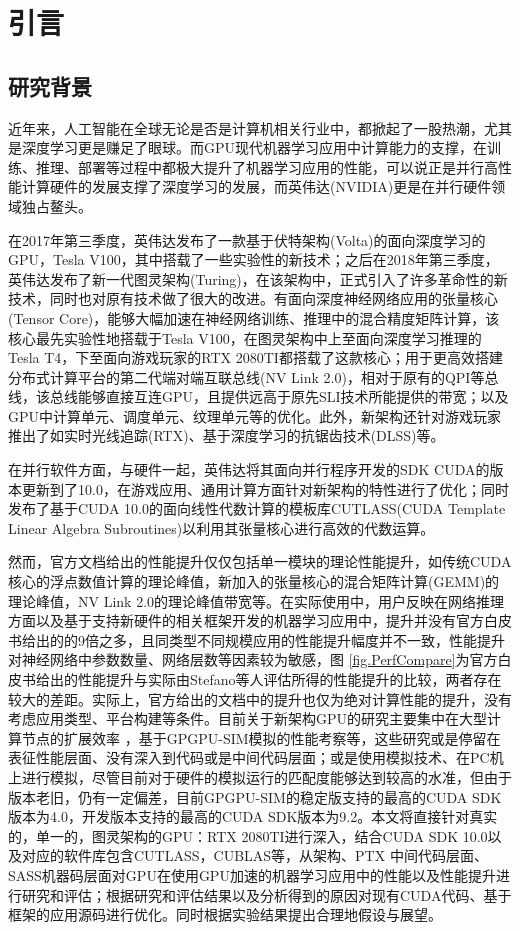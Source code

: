 \newpage
\section{引言}
\setcounter{table}{0}
\setcounter{figure}{0}
\subsection{研究背景}
\par 近年来，人工智能在全球无论是否是计算机相关行业中，都掀起了一股热潮，尤其是深度学习更是赚足了眼球。而GPU现代机器学习应用中计算能力的支撑，在训练、推理、部署等过程中都极大提升了机器学习应用的性能，可以说正是并行高性能计算硬件的发展支撑了深度学习的发展，而英伟达(NVIDIA)更是在并行硬件领域独占鳌头。
\par 在2017年第三季度，英伟达发布了一款基于伏特架构(Volta)的面向深度学习的GPU，Tesla V100\cite{TESLAV100}，其中搭载了一些实验性的新技术；之后在2018年第三季度，英伟达发布了新一代图灵架构(Turing)，在该架构中，正式引入了许多革命性的新技术，同时也对原有技术做了很大的改进。有面向深度神经网络应用的张量核心(Tensor Core)\cite{TENSORCORE}，能够大幅加速在神经网络训练、推理中的混合精度矩阵计算，该核心最先实验性地搭载于Tesla V100，在图灵架构中上至面向深度学习推理的Tesla T4，下至面向游戏玩家的RTX 2080TI都搭载了这款核心；用于更高效搭建分布式计算平台的第二代端对端互联总线(NV Link 2.0)\cite{NVLINK2}，相对于原有的QPI等总线，该总线能够直接互连GPU，且提供远高于原先SLI技术所能提供的带宽；以及GPU中计算单元、调度单元、纹理单元等的优化。此外，新架构还针对游戏玩家推出了如实时光线追踪(RTX)、基于深度学习的抗锯齿技术(DLSS)等。
\par 在并行软件方面，与硬件一起，英伟达将其面向并行程序开发的SDK CUDA的版本更新到了10.0，在游戏应用、通用计算方面针对新架构的特性进行了优化；同时发布了基于CUDA 10.0的面向线性代数计算的模板库CUTLASS(CUDA Template Linear Algebra Subroutines)\cite{CUTLASS}以利用其张量核心进行高效的代数运算。
\par 然而，官方文档给出的性能提升仅仅包括单一模块的理论性能提升，如传统CUDA核心的浮点数值计算的理论峰值，新加入的张量核心的混合矩阵计算(GEMM)的理论峰值，NV Link 2.0的理论峰值带宽等。在实际使用中，用户反映在网络推理方面以及基于支持新硬件的相关框架开发的机器学习应用中，提升并没有官方白皮书给出的的9倍之多\cite{VOLTAWHITEPAPER}，且同类型不同规模应用的性能提升幅度并不一致，性能提升对神经网络中参数数量、网络层数等因素较为敏感，图 \ref{fig.PerfCompare}为官方白皮书给出的性能提升与实际由Stefano等人评估所得的性能提升的比较，两者存在较大的差距。实际上，官方给出的文档中的提升也仅为绝对计算性能的提升，没有考虑应用类型、平台构建等条件。目前关于新架构GPU的研究主要集中在大型计算节点的扩展效率 \cite{EXASCLEDL}，基于GPGPU-SIM模拟的性能考察等\cite{MODELING}，这些研究或是停留在表征性能层面、没有深入到代码或是中间代码层面；或是使用模拟技术、在PC机上进行模拟，尽管目前对于硬件的模拟运行的匹配度能够达到较高的水准，但由于版本老旧，仍有一定偏差，目前GPGPU-SIM的稳定版支持的最高的CUDA SDK版本为4.0，开发版本支持的最高的CUDA SDK版本为9.2。本文将直接针对真实的，单一的，图灵架构的GPU：RTX 2080TI进行深入，结合CUDA SDK 10.0以及对应的软件库包含CUTLASS，CUBLAS等，从架构、PTX 中间代码层面、SASS机器码层面对GPU在使用GPU加速的机器学习应用中的性能以及性能提升进行研究和评估；根据研究和评估结果以及分析得到的原因对现有CUDA代码、基于框架的应用源码进行优化。同时根据实验结果提出合理地假设与展望。
